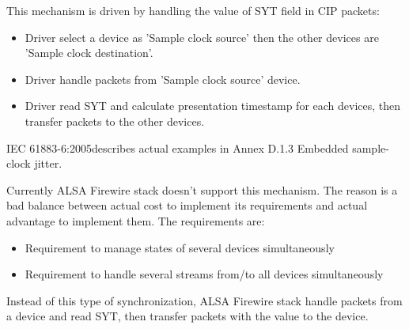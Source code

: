 \documentclass[onecolumn]{article}
\begin{document}
This mechanism is driven by handling the value of SYT field in CIP packets:
\begin{itemize}
\item Driver select a device as 'Sample clock source' then the other devices are 'Sample clock destination'.
\item Driver handle packets from 'Sample clock source' device.
\item Driver read SYT and calculate presentation timestamp for each devices, then transfer packets to the other devices.
\end{itemize}

IEC 61883-6:2005\cite{iec61883-6-2}describes actual examples in Annex D.1.3 Embedded sample-clock jitter.

Currently ALSA Firewire stack doesn't support this mechanism. The reason is a bad balance between actual cost to implement its requirements and actual advantage to implement them. The requirements are:
\begin{itemize}
\item Requirement to manage states of several devices simultaneously
\item Requirement to handle several streams from/to all devices simultaneously
\end{itemize}

Instead of this type of synchronization, ALSA Firewire stack handle packets from a device and read SYT, then transfer packets with the value to the device.
\end{document}
